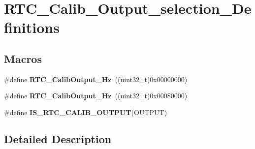 \hypertarget{group___r_t_c___calib___output__selection___definitions}{\section{R\-T\-C\-\_\-\-Calib\-\_\-\-Output\-\_\-selection\-\_\-\-Definitions}
\label{group___r_t_c___calib___output__selection___definitions}
}
\subsection*{Macros}
\begin{DoxyCompactItemize}
\item 
\hypertarget{group___r_t_c___calib___output__selection___definitions_gab689d5d180e58a9d5054481d59d45767}{\#define {\bfseries R\-T\-C\-\_\-\-Calib\-Output\-\_\-Hz}~((uint32\-\_\-t)0x00000000)}\label{group___r_t_c___calib___output__selection___definitions_gab689d5d180e58a9d5054481d59d45767}

\item 
\hypertarget{group___r_t_c___calib___output__selection___definitions_gaea4082d5ce14a94a602e40e0398125bd}{\#define {\bfseries R\-T\-C\-\_\-\-Calib\-Output\-\_\-Hz}~((uint32\-\_\-t)0x00080000)}\label{group___r_t_c___calib___output__selection___definitions_gaea4082d5ce14a94a602e40e0398125bd}

\item 
\#define {\bfseries I\-S\-\_\-\-R\-T\-C\-\_\-\-C\-A\-L\-I\-B\-\_\-\-O\-U\-T\-P\-U\-T}(O\-U\-T\-P\-U\-T)
\end{DoxyCompactItemize}


\subsection{Detailed Description}


